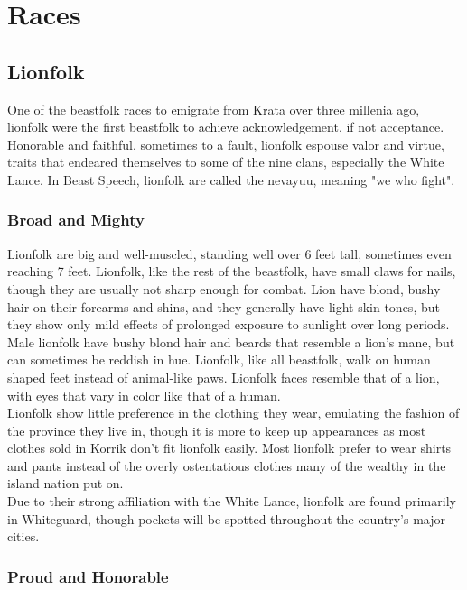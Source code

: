 \documentclass[10pt,twoside,twocolumn,openany]{book}
\begin{document}
\selectfont %

\chapter{Races}

\section{Lionfolk}

One of the beastfolk races to emigrate from Krata over three millenia ago, lionfolk were the first beastfolk to achieve acknowledgement, if not acceptance. Honorable and faithful, sometimes to a fault, lionfolk espouse valor and virtue, traits that endeared themselves to some of the nine clans, especially the White Lance. In Beast Speech, lionfolk are called the nevayuu, meaning "we who fight".

\subsection{Broad and Mighty}

Lionfolk are big and well-muscled, standing well over 6 feet tall, sometimes even reaching 7 feet. Lionfolk, like the rest of the beastfolk, have small claws for nails, though they are usually not sharp enough for combat. Lion have blond, bushy hair on their forearms and shins, and they generally have light skin tones, but they show only mild effects of prolonged exposure to sunlight over long periods. Male lionfolk have bushy blond hair and beards that resemble a lion's mane, but can sometimes be reddish in hue. Lionfolk, like all beastfolk, walk on human shaped feet instead of animal-like paws. Lionfolk faces resemble that of a lion, with eyes that vary in color like that of a human.\\
Lionfolk show little preference in the clothing they wear, emulating the fashion of the province they live in, though it is more to keep up appearances as most clothes sold in Korrik don't fit lionfolk easily. Most lionfolk prefer to wear shirts and pants instead of the overly ostentatious clothes many of the wealthy in the island nation put on.\\
Due to their strong affiliation with the White Lance, lionfolk are found primarily in Whiteguard, though pockets will be spotted throughout the country's major cities.

\subsection{Proud and Honorable}
\end{document}
